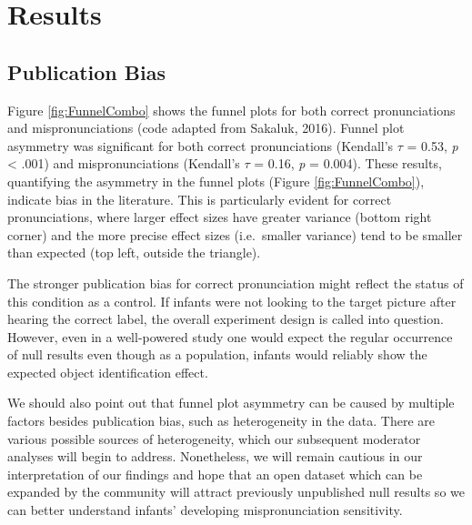 \documentclass[man, noextraspace]{apa6}
\begin{document}
\hypertarget{results}{%
\section{Results}\label{results}}

\hypertarget{publication-bias-1}{%
\subsection{Publication Bias}\label{publication-bias-1}}

Figure \ref{fig:FunnelCombo} shows the funnel plots for both correct pronunciations and mispronunciations (code adapted from Sakaluk, 2016). Funnel plot asymmetry was significant for both correct pronunciations (Kendall's \(\tau\) = 0.53, \emph{p} \textless{} .001) and mispronunciations (Kendall's \(\tau\) = 0.16, \emph{p} = 0.004). These results, quantifying the asymmetry in the funnel plots (Figure \ref{fig:FunnelCombo}), indicate bias in the literature. This is particularly evident for correct pronunciations, where larger effect sizes have greater variance (bottom right corner) and the more precise effect sizes (i.e.~smaller variance) tend to be smaller than expected (top left, outside the triangle).

The stronger publication bias for correct pronunciation might reflect the status of this condition as a control. If infants were not looking to the target picture after hearing the correct label, the overall experiment design is called into question. However, even in a well-powered study one would expect the regular occurrence of null results even though as a population, infants would reliably show the expected object identification effect.

We should also point out that funnel plot asymmetry can be caused by multiple factors besides publication bias, such as heterogeneity in the data. There are various possible sources of heterogeneity, which our subsequent moderator analyses will begin to address. Nonetheless, we will remain cautious in our interpretation of our findings and hope that an open dataset which can be expanded by the community will attract previously unpublished null results so we can better understand infants' developing mispronunciation sensitivity.
\end{document}
